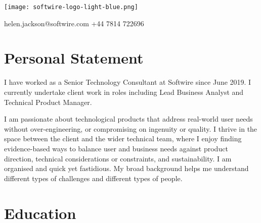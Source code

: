 \documentclass[a4paper, oneside, final, 11pt]{scrartcl} %
\begin{document}

\vspace*{-36px}
\texttt{[image: softwire-logo-light-blue.png]} 

\bigskip
\bigskip
\bigskip



\bigskip

\faEnvelopeO \space helen.jackson@softwire.com \hfill  \faMobile \space +44 7814 722696

\medskip

\section{Personal Statement}
I have worked as a Senior Technology Consultant at Softwire since June 2019. I currently undertake client work in roles including Lead Business Analyst and Technical Product Manager. \par

\medskip

I am passionate about technological products that address real-world user needs without over-engineering, or compromising on ingenuity or quality.
I thrive in the space between the client and the wider technical team, where I enjoy finding evidence-based ways to balance user and business needs against product direction, technical considerations or constraints, and sustainability.
I am organised and quick yet fastidious.
My broad background helps me understand different types of challenges and different types of people.\par

\medskip

\section{Education}
\end{document}
